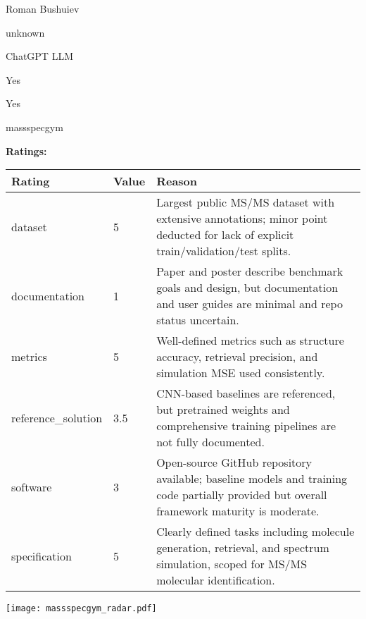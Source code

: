 {{\begin{description}[labelwidth=4cm, labelsep=1em, leftmargin=4cm, itemsep=0.1em, parsep=0em]
  \item[contact.name:] Roman Bushuiev
  \item[contact.email:] unknown
  \item[results.links.name:] ChatGPT LLM
  \item[fair.reproducible:] Yes
  \item[fair.benchmark\_ready:] Yes
  \item[id:] massspecgym
  \item[Citations:] \cite{neurips2024_c6c31413}
\end{description}

{\bf Ratings:} ~ \\

\begin{tabular}{p{} p{} p{}}
\hline
Rating & Value & Reason \\
\hline
dataset & 5 & Largest public MS/MS dataset with extensive annotations; minor point deducted for
lack of explicit train/validation/test splits.
 \\
documentation & 1 & Paper and poster describe benchmark goals and design, but documentation and user
guides are minimal and repo status uncertain.
 \\
metrics & 5 & Well-defined metrics such as structure accuracy, retrieval precision, and simulation MSE
used consistently.
 \\
reference\_solution & 3.5 & CNN-based baselines are referenced, but pretrained weights and comprehensive training
pipelines are not fully documented.
 \\
software & 3 & Open-source GitHub repository available; baseline models and training code partially
provided but overall framework maturity is moderate.
 \\
specification & 5 & Clearly defined tasks including molecule generation, retrieval, and spectrum simulation,
scoped for MS/MS molecular identification.
 \\
\hline
\end{tabular}

\texttt{[image: massspecgym\_radar.pdf]}
}}
\clearpage